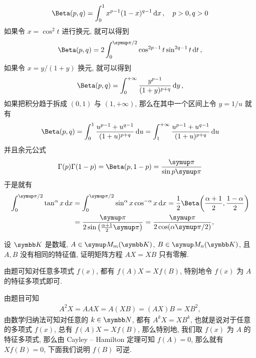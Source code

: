 \begin{exercise}[series=exer]
\begin{answer}
\begin{align*}
            \Beta(p, q) = \int_{0}^{1} x^{p - 1}(1 - x)^{q - 1} \dd{x},\quad p > 0, q > 0
        \end{align*}
        如果令 $ x = \cos^{2} t $ 进行换元, 就可以得到
        \begin{align*}
            \Beta(p, q) = 2 \int_{0}^{\pi/2} \cos^{2p - 1}t \sin^{2q-1} t \dd{t},
        \end{align*}
        如果令 $ x = y/(1 + y) $ 换元, 就可以得到
        \begin{align*}
            \Beta(p, q) = \int_{0}^{+\infty} \frac{y^{p - 1}}{(1 + y)^{p + q}} \dd{y},
        \end{align*}
        如果把积分趋于拆成 $ (0, 1) $ 与 $ (1, +\infty) $, 那么在其中一个区间上令 $ y = 1/u $ 就有
        \begin{align*}
            \Beta(p, q) = \int_{0}^{1} \frac{u^{p - 1} + u^{q - 1}}{(1 + u)^{p + q}} \dd{u} = \int_{1}^{+\infty} \frac{u^{p - 1} + u^{q - 1}}{(1 + u)^{p + q}} \dd{u}
        \end{align*}
        并且余元公式
        \begin{align*}
            \Gamma(p)\Gamma(1 - p) = \Beta(p, 1 - p) = \frac{\pi}{\sin p\pi}
        \end{align*}
        于是就有
        \begin{align*}
            \int_{0}^{\pi/2} \tan^{\alpha}x \dd{x} & = \int_{0}^{\pi/2} \sin^{\alpha}x\cos^{-\alpha}x \dd{x} = \frac{1}{2}\Beta\qty(\frac{\alpha + 1}{2}, \frac{1 - \alpha}{2}) \\
                                                   & = \frac{\pi}{2\sin\qty(\frac{\alpha + 1}{2}\pi)} = \frac{\pi}{2\cos(\alpha\pi/2)},
        \end{align*}
    \end{answer}
    \sitem\label{item:AX=XB} 设 $ \K $ 是数域, $ A \in \MM[\K][m] $, $ B \in \MM[\K][n] $, 且 $ A, B $ 没有相同的特征值, 证明矩阵方程 $ AX = XB $ 只有零解.
    \begin{hint}
        由题可知对任意多项式 $ f(x) $, 都有 $ f(A)X = Xf(B) $, 特别地令 $ f(x) $ 为 $ A $ 的特征多项式即可.
    \end{hint}
    \begin{answer}
        由题目可知
        \begin{align*}
            A^{2}X = AAX = A(XB) = (AX)B = XB^{2},
        \end{align*}
        由数学归纳法可知对任意的 $ k \in \N $, 都有 $ A^{k}X = XB^{k} $, 也就是说对于任意的多项式 $ f(x) $, 总有 $ f(A)X = Xf(B) $, 那么特别地, 我们取 $ f(x) $ 为 $ A $ 的特征多项式, 那么由 Cayley -- Hamilton 定理可知 $ f(A) = 0 $, 那么就有 $ Xf(B) = 0 $, 下面我们说明 $ f(B) $ 可逆. 


\end{answer}
\end{exercise}
